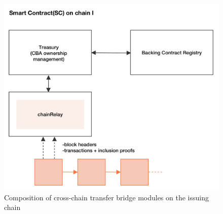 \begin{figure}
\centering
\includegraphics[scale=0.2]{pic/Smart Contract(SC) on chain I.jpg}
\caption{Composition of cross-chain transfer bridge modules on the issuing chain}
\label{fig:picture001}
\end{figure}

\newpage